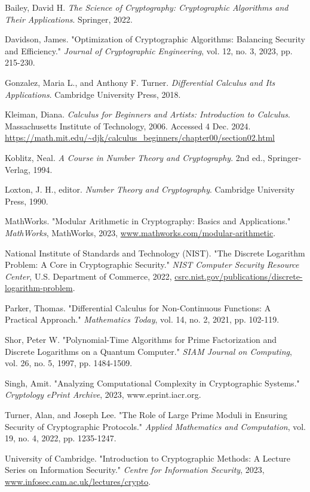 \documentclass[12pt]{article}
\begin{document}
\renewcommand{\refname}{Works Cited}
\begin{thebibliography}{9}

Bailey, David H. \textit{The Science of Cryptography: Cryptographic Algorithms and Their Applications}. Springer, 2022.

Davidson, James. "Optimization of Cryptographic Algorithms: Balancing Security and Efficiency." \textit{Journal of Cryptographic Engineering}, vol. 12, no. 3, 2023, pp. 215-230.

Gonzalez, Maria L., and Anthony F. Turner. \textit{Differential Calculus and Its Applications}. Cambridge University Press, 2018.

    Kleiman, Diana. \textit{Calculus for Beginners and Artists: Introduction to Calculus}. Massachusetts Institute of Technology, 2006. Accessed 4 Dec. 2024. \url{https://math.mit.edu/~djk/calculus\_beginners/chapter00/section02.html}

Koblitz, Neal. \textit{A Course in Number Theory and Cryptography}. 2nd ed., Springer-Verlag, 1994.

Loxton, J. H., editor. \textit{Number Theory and Cryptography}. Cambridge University Press, 1990.

MathWorks. "Modular Arithmetic in Cryptography: Basics and Applications." \textit{MathWorks}, MathWorks, 2023, \url{www.mathworks.com/modular-arithmetic}.

National Institute of Standards and Technology (NIST). "The Discrete Logarithm Problem: A Core in Cryptographic Security." \textit{NIST Computer Security Resource Center}, U.S. Department of Commerce, 2022, \url{csrc.nist.gov/publications/discrete-logarithm-problem}.

Parker, Thomas. "Differential Calculus for Non-Continuous Functions: A Practical Approach." \textit{Mathematics Today}, vol. 14, no. 2, 2021, pp. 102-119.

Shor, Peter W. "Polynomial-Time Algorithms for Prime Factorization and Discrete Logarithms on a Quantum Computer." \textit{SIAM Journal on Computing}, vol. 26, no. 5, 1997, pp. 1484-1509.

Singh, Amit. "Analyzing Computational Complexity in Cryptographic Systems." \textit{Cryptology ePrint Archive}, 2023, www.eprint.iacr.org.

Turner, Alan, and Joseph Lee. "The Role of Large Prime Moduli in Ensuring Security of Cryptographic Protocols." \textit{Applied Mathematics and Computation}, vol. 19, no. 4, 2022, pp. 1235-1247.

University of Cambridge. "Introduction to Cryptographic Methods: A Lecture Series on Information Security." \textit{Centre for Information Security}, 2023, \url{www.infosec.cam.ac.uk/lectures/crypto}.

\end{thebibliography}
\end{document}
